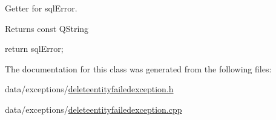 \-Getter for sql\-Error. 

\begin{DoxyReturn}{\-Returns}
const \-Q\-String 
\end{DoxyReturn}

\begin{DoxyCode}
{
    return sqlError;
}
\end{DoxyCode}


\-The documentation for this class was generated from the following files\-:\begin{DoxyCompactItemize}
\item 
data/exceptions/\hyperlink{deleteentityfailedexception_8h}{deleteentityfailedexception.\-h}\item 
data/exceptions/\hyperlink{deleteentityfailedexception_8cpp}{deleteentityfailedexception.\-cpp}\end{DoxyCompactItemize}
